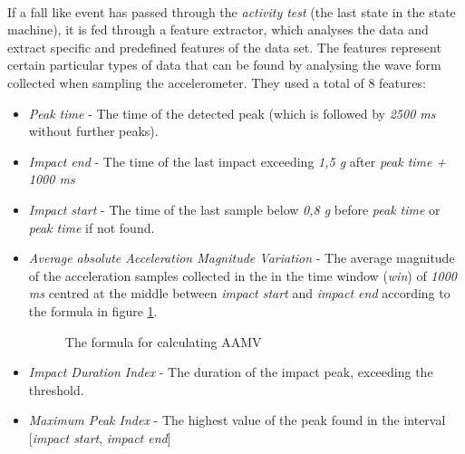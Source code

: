 \documentclass[12pt, a4paper, onecolumn]{article}
\begin{document}
	
	
	\paragraph{} If a fall like event has passed through the  \textit{activity test} (the last state in the state machine), it is fed through a feature extractor, which analyses the data and extract specific and predefined features of the data set. The features represent certain particular types of data that can be found by analysing the wave form collected when sampling the accelerometer. They used a total of 8 features:
	
	\begin{itemize}
		\item \textit{Peak time} - The time of the detected peak (which is followed by \textit{2500 ms} without further peaks).
		\item \textit{Impact end} - The time of the last impact exceeding \textit{1,5 g} after \textit{peak time + 1000 ms}
		\item  \textit{Impact start} - The time of the last sample below \textit{0,8 g} before \textit{peak time} or \textit{peak time} if not found.
		
		\item \textit{Average absolute Acceleration Magnitude Variation} - The average magnitude of the acceleration samples collected in the in the time window (\textit{win}) of \textit{1000 ms} centred at the middle between \textit{impact start} and \textit{impact end} according to the formula in figure \ref{fig:AAMV-formula}.
		
		
		\begin{figure}[H]
			\centering
			\caption{The formula for calculating AAMV \cite{piza_uni}}%
			\label{fig:AAMV-formula}%
		\end{figure}
		
		\item \textit{Impact Duration Index} - The duration of the impact peak, exceeding the threshold.
		\item \textit{Maximum Peak Index} - The highest value of the peak found in the interval [\textit{impact start}, \textit{impact end}]
		

\end{itemize}
\end{document}

